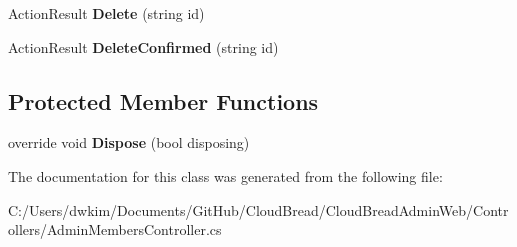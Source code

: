 \begin{DoxyCompactItemize}
\item 
Action\+Result {\bfseries Delete} (string id)\hypertarget{a00013_a43024af377d48e0b3565d866e170923c}{}\label{a00013_a43024af377d48e0b3565d866e170923c}

\item 
Action\+Result {\bfseries Delete\+Confirmed} (string id)\hypertarget{a00013_a08adec6752aa78f11f627f17d52da9e1}{}\label{a00013_a08adec6752aa78f11f627f17d52da9e1}

\end{DoxyCompactItemize}
\subsection*{Protected Member Functions}
\begin{DoxyCompactItemize}
\item 
override void {\bfseries Dispose} (bool disposing)\hypertarget{a00013_a442b9a0fb19da8118b1c87ba48a5fe52}{}\label{a00013_a442b9a0fb19da8118b1c87ba48a5fe52}

\end{DoxyCompactItemize}


The documentation for this class was generated from the following file\+:\begin{DoxyCompactItemize}
\item 
C\+:/\+Users/dwkim/\+Documents/\+Git\+Hub/\+Cloud\+Bread/\+Cloud\+Bread\+Admin\+Web/\+Controllers/Admin\+Members\+Controller.\+cs\end{DoxyCompactItemize}
